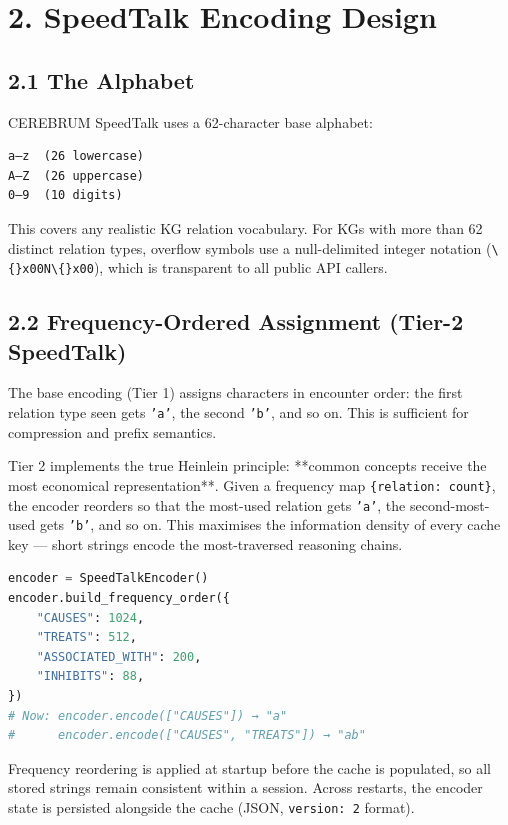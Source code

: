 \section*{2. SpeedTalk Encoding Design}

\subsection*{2.1 The Alphabet}

CEREBRUM SpeedTalk uses a 62-character base alphabet:

\begin{lstlisting}
a–z  (26 lowercase)
A–Z  (26 uppercase)
0–9  (10 digits)
\end{lstlisting}

This covers any realistic KG relation vocabulary.  For KGs with more than 62
distinct relation types, overflow symbols use a null-delimited integer notation
(\texttt{\textbackslash\{\}x00N\textbackslash\{\}x00}), which is transparent to all public API callers.

\subsection*{2.2 Frequency-Ordered Assignment (Tier-2 SpeedTalk)}

The base encoding (Tier 1) assigns characters in encounter order: the first relation
type seen gets \texttt{'a'}, the second \texttt{'b'}, and so on.  This is sufficient for
compression and prefix semantics.

Tier 2 implements the true Heinlein principle: **common concepts receive the most
economical representation**.  Given a frequency map \texttt{\{relation: count\}}, the encoder
reorders so that the most-used relation gets \texttt{'a'}, the second-most-used gets \texttt{'b'},
and so on.  This maximises the information density of every cache key --- short strings
encode the most-traversed reasoning chains.

\begin{lstlisting}[language=Python]
encoder = SpeedTalkEncoder()
encoder.build_frequency_order({
    "CAUSES": 1024,
    "TREATS": 512,
    "ASSOCIATED_WITH": 200,
    "INHIBITS": 88,
})
# Now: encoder.encode(["CAUSES"]) → "a"
#      encoder.encode(["CAUSES", "TREATS"]) → "ab"
\end{lstlisting}

Frequency reordering is applied at startup before the cache is populated, so all
stored strings remain consistent within a session.  Across restarts, the encoder
state is persisted alongside the cache (JSON, \texttt{version: 2} format).

